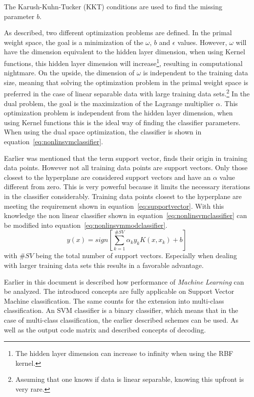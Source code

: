 The Karush-Kuhn-Tucker (KKT) conditions are used to find the missing parameter $b$.
\par 
As described, two different optimization problems are defined. 
In the primal weight space, the goal is a minimization of the $\omega$, $b$ and $\epsilon$ values. 
However, $\omega$ will have the dimension equivalent to the hidden layer dimension, when using Kernel functions, this hidden layer dimension will increase\footnote{The hidden layer dimension can increase to infinity when using the RBF kernel.}, resulting in computational nightmare.
On the upside, the dimension of $\omega$ is independent to the training data size, meaning that solving the optimization problem in the primal weight space is preferred in the case of linear separable data with large training data sets.\footnote{Assuming that one knows if data is linear separable, knowing this upfront is very rare.}
In the dual problem, the goal is the maximization of the Lagrange multiplier $\alpha$.
This optimization problem is independent from the hidden layer dimension, when using Kernel functions this is the ideal way of finding the classifier parameters.
When using the dual space optimization, the classifier is shown in equation~\ref{eq:nonlinsvmclassifier}.
\par 
Earlier was mentioned that the term support vector, finds their origin in training data points. 
However not all training data points are support vectors.
Only those closest to the hyperplane are considered support vectors and have an $\alpha$ value different from zero.
This is very powerful because it limits the necessary iterations in the classifier considerably.
Training data points closest to the hyperplane are meeting the requirement shown in equation~\ref{eq:supportvector}.
With this knowledge the non linear classifier shown in equation~\ref{eq:nonlinsvmclassifier} can be modified into equation~\ref{eq:nonlinsvmmodclassifier}.
\begin{equation}
	y(x) = sign\left[ \sum_{k=1}^{\# SV} \alpha_k y_k K(x,x_k) + b \right]
	\label{eq:nonlinsvmmodclassifier}
\end{equation}
with $\# SV$ being the total number of support vectors.
Especially when dealing with larger training data sets this results in a favorable advantage.
\par 
Earlier in this document is described how performance of \textit{Machine Learning} can be analyzed. 
The introduced concepts are fully applicable on Support Vector Machine classification.
The same counts for the extension into multi-class classification. 
An SVM classifier is a binary classifier, which means that in the case of multi-class classification, the earlier described schemes can be used.
As well as the output code matrix and described concepts of decoding.

